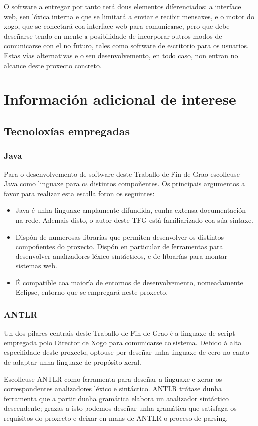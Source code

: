 O software a entregar por tanto terá dous elementos diferenciados: a interface web, sen lóxica interna e
que se limitará a enviar e recibir mensaxes, e o motor do xogo, que se conectará coa interface web para
comunicarse, pero que debe deseñarse tendo en mente a posibilidade de incorporar outros modos de
comunicarse con el no futuro, tales como software de escritorio para os usuarios. Estas vías alternativas e
o seu desenvolvemento, en todo caso, non entran no alcance deste proxecto concreto.

\section{Información adicional de interese}
\subsection{Tecnoloxías empregadas}

\subsubsection{Java}
Para o desenvolvemento do software deste Traballo de Fin de Grao escolleuse Java
como linguaxe para os distintos compoñentes. Os principais argumentos a favor
para realizar esta escolla foron os seguintes:
\begin{itemize}
  \item Java é unha linguaxe amplamente difundida, cunha extensa documentación
  na rede. Ademais disto, o autor deste TFG está familiarizado coa súa sintaxe.
  \item Dispón de numerosas librarías que permiten desenvolver os distintos
  compoñentes do proxecto. Dispón en particular de ferramentas para desenvolver
  analizadores léxico-sintácticos, e de librarías para montar sistemas web.
  \item É compatible coa maioría de entornos de desenvolvemento, nomeadamente
  Eclipse, entorno que se empregará neste proxecto.
\end{itemize}

\subsubsection{ANTLR}
Un dos pilares centrais deste Traballo de Fin de Grao é a linguaxe de script
empregada polo Director de Xogo para comunicarse co sistema. Debido á alta
especifidade deste proxecto, optouse por deseñar unha linguaxe de
cero no canto de adaptar unha linguaxe de propósito xeral.
\par
Escolleuse ANTLR como ferramenta para deseñar a linguaxe e xerar os
correspondentes analizadores léxico e sintáctico. ANTLR trátase dunha ferramenta
que a partir dunha gramática elabora un analizador sintáctico descendente;
grazas a isto podemos deseñar unha gramática que satisfaga os requisitos do
proxecto e deixar en mans de ANTLR o proceso de parsing.

